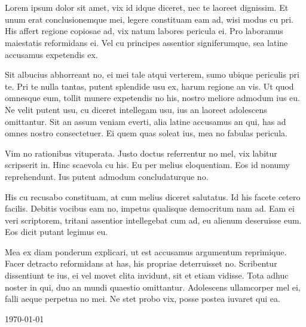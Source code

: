 \chapter*{\kataPengantar}
Lorem ipsum dolor sit amet, vix id idque diceret, nec te laoreet dignissim. Et unum erat conclusionemque mei, legere constituam eam ad, wisi modus cu pri. His affert regione copiosae ad, vix natum labores pericula ei. Pro laboramus maiestatis reformidans ei. Vel cu principes assentior signiferumque, sea latine accusamus expetendis ex.

Sit albucius abhorreant no, ei mei tale atqui verterem, sumo ubique periculis pri te. Pri te nulla tantas, putent splendide usu ex, harum regione an vis. Ut quod omnesque eum, tollit munere expetendis no his, nostro meliore admodum ius eu. Ne velit putent usu, cu diceret intellegam usu, ius an laoreet adolescens omittantur. Sit an assum veniam everti, alia latine accusamus an qui, has ad omnes nostro consectetuer. Ei quem quas soleat ius, mea no fabulas pericula.

Vim no rationibus vituperata. Justo doctus referrentur no mel, vix labitur scripserit in. Hinc scaevola cu his. Eu per melius eloquentiam. Eos id nonumy reprehendunt. Ius putent admodum concludaturque no.

His cu recusabo constituam, at cum melius diceret salutatus. Id his facete cetero facilis. Debitis vocibus eam no, impetus qualisque democritum nam ad. Eam ei veri scriptorem, tritani assentior intellegebat cum ad, eu alienum deseruisse eum. Eos dicit putant legimus eu.

Mea ex diam ponderum explicari, ut est accusamus argumentum reprimique. Facer detracto reformidans at has, his propriae deterruisset no. Scribentur dissentiunt te ius, ei vel movet clita invidunt, sit et etiam vidisse. Tota adhuc noster in qui, duo an mundi quaestio omittantur. Adolescens ullamcorper mel ei, falli aeque perpetua no mei. Ne stet probo vix, posse postea iuvaret qui ea.

\vspace*{0.1cm}
\begin{flushright}
\today\\[0.1cm]
\vspace*{1cm}
\penulis

\end{flushright}